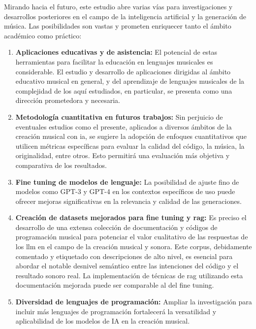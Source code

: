Mirando hacia el futuro, este estudio abre varias vías para investigaciones y desarrollos posteriores en el campo de la inteligencia artificial y la generación de música. Las posibilidades son vastas y prometen enriquecer tanto el ámbito académico como práctico:

\begin{enumerate}
\item \textbf{Aplicaciones educativas y de asistencia:} El potencial de estas herramientas para facilitar la educación en lenguajes musicales es considerable. El estudio y desarrollo de aplicaciones dirigidas al ámbito educativo musical en general, y del aprendizaje de lenguajes musicales de la complejidad de los aquí estudiados, en particular, se presenta como una dirección prometedora y necesaria.

\item \textbf{Metodología cuantitativa en futuros trabajos:} Sin perjuicio de eventuales estudios como el presente, aplicados a diversos ámbitos de la creación musical con \gls{ia}, se sugiere la adopción de enfoques cuantitativos que utilicen métricas específicas para evaluar la calidad del código, la música, la originalidad, entre otros. Esto permitirá una evaluación más objetiva y comparativa de los resultados.

\item \textbf{Fine tuning de modelos de lenguaje:} La posibilidad de ajuste fino de modelos como GPT-3 y GPT-4 en los contextos específicos de uso puede ofrecer mejoras significativas en la relevancia y calidad de las generaciones.

\item \textbf{Creación de datasets mejorados para fine tuning y \gls{rag}:} Es preciso el desarrollo de una extensa colección de documentación y códigos de programación musical para potenciar el valor cualitativo de las respuestas de los \gls{llm} en el campo de la creación musical y sonora. Este corpus, debidamente comentado y etiquetado con descripciones de alto nivel, es esencial para abordar el notable desnivel semántico entre las intenciones del código y el resultado sonoro real. La implementación de técnicas de \gls{rag} utilizando esta documentación mejorada puede ser comparable al del fine tuning.

\item \textbf{Diversidad de lenguajes de programación:} Ampliar la investigación para incluir más lenguajes de programación fortalecerá la versatilidad y aplicabilidad de los modelos de IA en la creación musical.


\end{enumerate}
